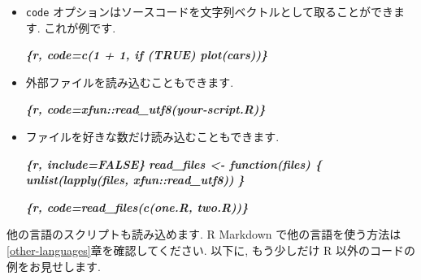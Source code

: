 \documentclass[
  11pt,
  lualatex,ja=standard,jafont=noto]{bxjsreport}
\newenvironment{Shaded}{\begin{snugshade}}{\end{snugshade}}
\newcommand{\InformationTok}[1]{\textcolor[rgb]{0.56,0.35,0.01}{\textbf{\textit{#1}}}}
\begin{document}
\begin{itemize}
\item
  \texttt{code} オプションはソースコードを文字列ベクトルとして取ることができます. これが例です.

\begin{Shaded}
\begin{Highlighting}[]
\InformationTok{\textasciigrave{}\textasciigrave{}\textasciigrave{}\{r, code=c(\textquotesingle{}1 + 1\textquotesingle{}, \textquotesingle{}if (TRUE) plot(cars)\textquotesingle{})\}}
\InformationTok{\textasciigrave{}\textasciigrave{}\textasciigrave{}}
\end{Highlighting}
\end{Shaded}
\item
  外部ファイルを読み込むこともできます.

\begin{Shaded}
\begin{Highlighting}[]
\InformationTok{\textasciigrave{}\textasciigrave{}\textasciigrave{}\{r, code=xfun::read\_utf8(\textquotesingle{}your{-}script.R\textquotesingle{})\}}
\InformationTok{\textasciigrave{}\textasciigrave{}\textasciigrave{}}
\end{Highlighting}
\end{Shaded}
\item
  ファイルを好きな数だけ読み込むこともできます.

\begin{Shaded}
\begin{Highlighting}[]
\InformationTok{\textasciigrave{}\textasciigrave{}\textasciigrave{}\{r, include=FALSE\}}
\InformationTok{read\_files \textless{}{-} function(files) \{}
\InformationTok{  unlist(lapply(files, xfun::read\_utf8))}
\InformationTok{\}}
\InformationTok{\textasciigrave{}\textasciigrave{}\textasciigrave{}}

\InformationTok{\textasciigrave{}\textasciigrave{}\textasciigrave{}\{r, code=read\_files(c(\textquotesingle{}one.R\textquotesingle{}, \textquotesingle{}two.R\textquotesingle{}))\}}
\InformationTok{\textasciigrave{}\textasciigrave{}\textasciigrave{}}
\end{Highlighting}
\end{Shaded}
\end{itemize}

他の言語のスクリプトも読み込めます. R Markdown で他の言語を使う方法は\ref{other-languages}章を確認してください. 以下に, もう少しだけ R 以外のコードの例をお見せします.
\end{document}
